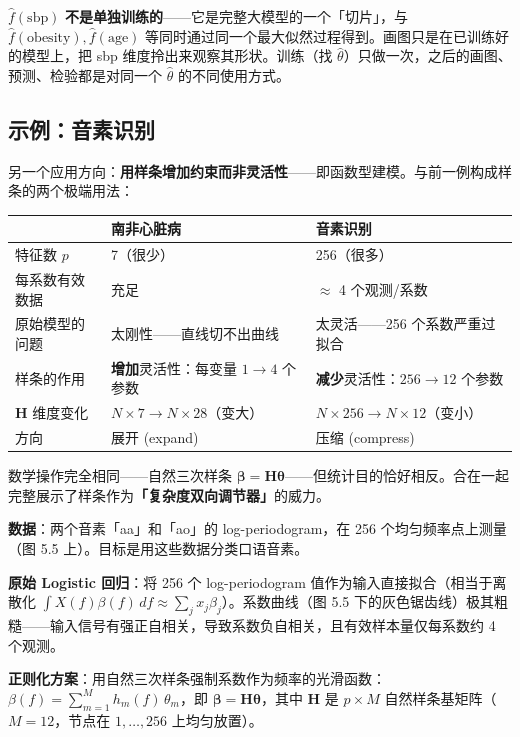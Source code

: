 $\hat{f}(\text{sbp})$ \textbf{不是单独训练的}——它是完整大模型的一个「切片」，与 $\hat{f}(\text{obesity}), \hat{f}(\text{age})$ 等同时通过同一个最大似然过程得到。画图只是在已训练好的模型上，把 sbp 维度拎出来观察其形状。训练（找 $\hat{\theta}$）只做一次，之后的画图、预测、检验都是对同一个 $\hat{\theta}$ 的不同使用方式。

\subsection{示例：音素识别}

另一个应用方向：\textbf{用样条增加约束而非灵活性}——即函数型建模。与前一例构成样条的两个极端用法：

\begin{center}
\begin{tabular}{lll}
\toprule
& 南非心脏病 & 音素识别 \\
\midrule
特征数 $p$ & 7（很少） & 256（很多） \\
每系数有效数据 & 充足 & $\approx$ 4 个观测/系数 \\
原始模型的问题 & 太刚性——直线切不出曲线 & 太灵活——256 个系数严重过拟合 \\
样条的作用 & \textbf{增加}灵活性：每变量 $1\to 4$ 个参数 & \textbf{减少}灵活性：$256\to 12$ 个参数 \\
$\mathbf{H}$ 维度变化 & $N\times 7 \to N\times 28$（变大） & $N\times 256 \to N\times 12$（变小） \\
方向 & 展开 (expand) & 压缩 (compress) \\
\bottomrule
\end{tabular}
\end{center}

数学操作完全相同——自然三次样条 $\boldsymbol{\beta} = \mathbf{H}\boldsymbol{\theta}$——但统计目的恰好相反。合在一起完整展示了样条作为\textbf{「复杂度双向调节器」}的威力。

\textbf{数据}：两个音素「aa」和「ao」的 log-periodogram，在 256 个均匀频率点上测量（图 5.5 上）。目标是用这些数据分类口语音素。

\textbf{原始 Logistic 回归}：将 256 个 log-periodogram 值作为输入直接拟合（相当于离散化 $\int X(f)\beta(f)\,df \approx \sum_j x_j\beta_j$）。系数曲线（图 5.5 下的灰色锯齿线）极其粗糙——输入信号有强正自相关，导致系数负自相关，且有效样本量仅每系数约 4 个观测。

\textbf{正则化方案}：用自然三次样条强制系数作为频率的光滑函数：$\beta(f) = \sum_{m=1}^{M} h_m(f)\,\theta_m$，即 $\boldsymbol{\beta} = \mathbf{H}\boldsymbol{\theta}$，其中 $\mathbf{H}$ 是 $p \times M$ 自然样条基矩阵（$M=12$，节点在 $1,\ldots,256$ 上均匀放置）。

